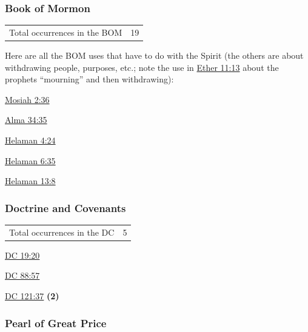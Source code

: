 		
	\subsubsection{Book of Mormon} %
		\label{WITHDRAW-BOM}
	
		\begin{tabular}{ll}
			Total occurrences in the BOM & 19
		\end{tabular}
		
		Here are all the BOM uses that have to do with the Spirit (the others are about withdrawing people, purposes, etc.; note the use in \hyperref[ETHER-11-13]{Ether 11:13} about the prophets ``mourning'' and then withdrawing):
		
		\begin{compactdesc}
			\item[{\hyperref[MOSIAH-2-36]{Mosiah 2:36}}]
			\item[{\hyperref[ALMA-34-35]{Alma 34:35}}]
			\item[{\hyperref[HELAMAN-4-24]{Helaman 4:24}}]
			\item[{\hyperref[HELAMAN-6-35]{Helaman 6:35}}]
			\item[{\hyperref[HELAMAN-13-8]{Helaman 13:8}}]
		\end{compactdesc}
		
	\subsubsection{Doctrine and Covenants} %
		\label{WITHDRAW-DC}
	
		\begin{tabular}{ll}
			Total occurrences in the DC & 5
		\end{tabular}
		
		\begin{compactdesc}
			\item[{\hyperref[DC19-20]{DC 19:20}}]
			\item[{\hyperref[DC88-57]{DC 88:57}}]
			\item[{\hyperref[DC121-37]{DC 121:37}}] \textbf{(2)}
		\end{compactdesc}
		
	\subsubsection{Pearl of Great Price} %
		\label{WITHDRAW-PGP}
	
